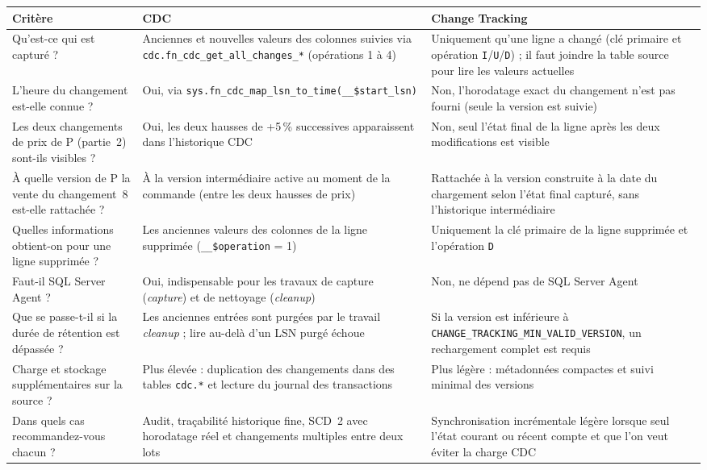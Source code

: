 \documentclass[9pt,a4paper]{article}
\begin{document}
\begingroup\small
\begin{tabularx}{\textwidth}{@{}>{\raggedright\arraybackslash}p{4.4cm}>{\raggedright\arraybackslash}p{6.2cm}X@{}}
\toprule
Critère & CDC & Change Tracking \\
\midrule
Qu'est-ce qui est capturé ? & Anciennes et nouvelles valeurs des colonnes suivies via \texttt{cdc.fn\_cdc\_get\_all\_changes\_*} (opérations 1 à 4) & Uniquement qu'une ligne a changé (clé primaire et opération \texttt{I}/\texttt{U}/\texttt{D}) ; il faut joindre la table source pour lire les valeurs actuelles \\
L'heure du changement est-elle connue ? & Oui, via \texttt{sys.fn\_cdc\_map\_lsn\_to\_time(\_\_\$start\_lsn)} & Non, l'horodatage exact du changement n'est pas fourni (seule la version est suivie) \\
Les deux changements de prix de P (partie~2) sont-ils visibles ? & Oui, les deux hausses de +5\,\% successives apparaissent dans l'historique CDC & Non, seul l'état final de la ligne après les deux modifications est visible \\
À quelle version de P la vente du changement~8 est-elle rattachée ? & À la version intermédiaire active au moment de la commande (entre les deux hausses de prix) & Rattachée à la version construite à la date du chargement selon l'état final capturé, sans l'historique intermédiaire \\
Quelles informations obtient-on pour une ligne supprimée ? & Les anciennes valeurs des colonnes de la ligne supprimée (\texttt{\_\_\$operation} = 1) & Uniquement la clé primaire de la ligne supprimée et l'opération \texttt{D} \\
Faut-il SQL Server Agent ? & Oui, indispensable pour les travaux de capture (\emph{capture}) et de nettoyage (\emph{cleanup}) & Non, ne dépend pas de SQL Server Agent \\
Que se passe-t-il si la durée de rétention est dépassée ? & Les anciennes entrées sont purgées par le travail \emph{cleanup} ; lire au-delà d'un LSN purgé échoue & Si la version est inférieure à \texttt{CHANGE\_TRACKING\_MIN\_VALID\_VERSION}, un rechargement complet est requis \\
Charge et stockage supplémentaires sur la source ? & Plus élevée : duplication des changements dans des tables \texttt{cdc.*} et lecture du journal des transactions & Plus légère : métadonnées compactes et suivi minimal des versions \\
Dans quels cas recommandez-vous chacun ? & Audit, traçabilité historique fine, SCD~2 avec horodatage réel et changements multiples entre deux lots & Synchronisation incrémentale légère lorsque seul l'état courant ou récent compte et que l'on veut éviter la charge CDC \\
\bottomrule
\end{tabularx}
\endgroup
\end{document}
